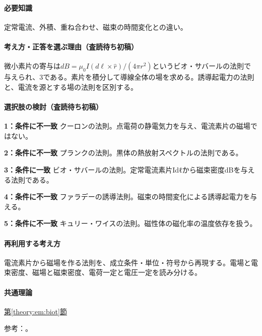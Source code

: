 \paragraph{必要知識} 定常電流、外積、重ね合わせ、磁束の時間変化との違い。

\paragraph{考え方・正答を選ぶ理由（査読待ち初稿）} 微小素片の寄与は\(dB=\mu_0 I(d\ell\times\hat r)/(4\pi r^2)\)というビオ・サバールの法則で与えられ、3である。素片を積分して導線全体の場を求める。誘導起電力の法則と、電流を源とする場の法則を区別する。

\paragraph{選択肢の検討（査読待ち初稿）}\mbox{}\par

\noindent\textbf{1：条件に不一致} クーロンの法則。点電荷の静電気力を与え、電流素片の磁場ではない。\par

\noindent\textbf{2：条件に不一致} プランクの法則。黒体の熱放射スペクトルの法則である。\par

\noindent\textbf{3：条件に一致} ビオ・サバールの法則。定常電流素片Idℓから磁束密度dBを与える法則である。\par

\noindent\textbf{4：条件に不一致} ファラデーの誘導法則。磁束の時間変化による誘導起電力を与える。\par

\noindent\textbf{5：条件に不一致} キュリー・ワイスの法則。磁性体の磁化率の温度依存を扱う。\par

\paragraph{再利用する考え方} 電流素片から磁場を作る法則を、成立条件・単位・符号から再現する。電場と電束密度、磁場と磁束密度、電荷一定と電圧一定を読み分ける。

\paragraph{共通理論} \hyperref[theory:em:biot]{第\ref*{theory:em:biot}節}

\par 参考：\cite{mit_em09}。

